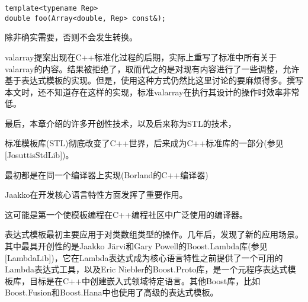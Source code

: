 \begin{lstlisting}[style=styleCXX]
template<typename Rep>
double foo(Array<double, Rep> const&);
\end{lstlisting}

除非确实需要，否则不会发生转换。

valarray提案出现在C++标准化过程的后期，实际上重写了标准中所有关于valarray的内容。结果被拒绝了，取而代之的是对现有内容进行了一些调整，允许基于表达式模板的实现。但是，使用这种方式仍然比这里讨论的要麻烦得多。撰写本文时，还不知道存在这样的实现，标准valarray在执行其设计的操作时效率非常低。

最后，本章介绍的许多开创性技术，以及后来称为STL的技术，

\begin{tcolorbox}[colback=webgreen!5!white,colframe=webgreen!75!black]
\hspace*{0.75cm}标准模板库(STL)彻底改变了C++世界，后来成为C++标准库的一部分(参见[JosuttisStdLib])。
\end{tcolorbox}

最初都是在同一个编译器上实现(Borland的C++编译器)

\begin{tcolorbox}[colback=webgreen!5!white,colframe=webgreen!75!black]
\hspace*{0.75cm}Jaakko在开发核心语言特性方面发挥了重要作用。
\end{tcolorbox}

这可能是第一个使模板编程在C++编程社区中广泛使用的编译器。

表达式模板最初主要应用于对类数组类型的操作。几年后，发现了新的应用场景。其中最具开创性的是Jaakko J{\"a}rvi和Gary Powell的Boost.Lambda库(参见[LambdaLib])，它在Lambda表达式成为核心语言特性之前提供了一个可用的Lambda表达式工具，以及Eric Niebler的Boost.Proto库，是一个元程序表达式模板库，目标是在C++中创建嵌入式领域特定语言。其他Boost库，比如Boost.Fusion和Boost.Hana中也使用了高级的表达式模板。



































